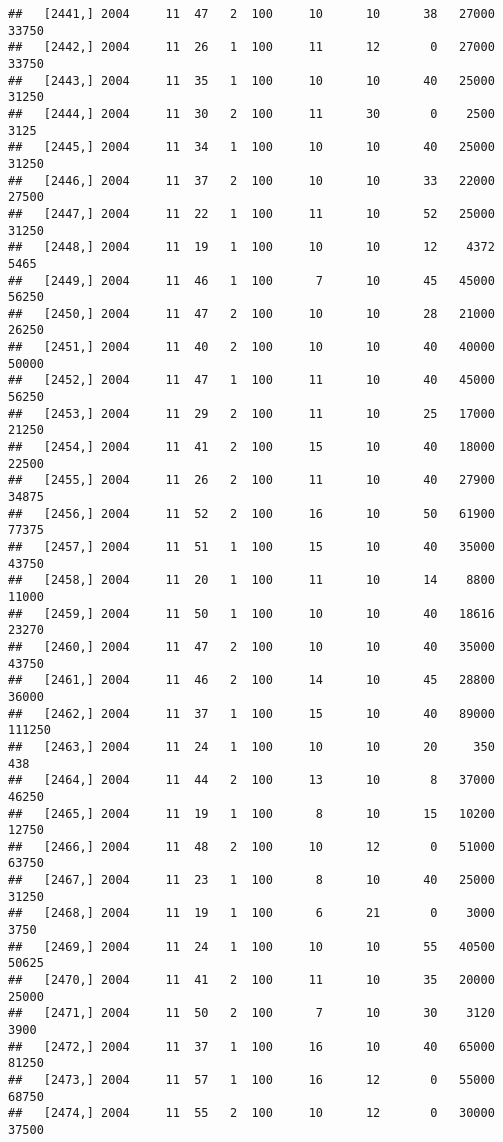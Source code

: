 \documentclass{article}\usepackage[]{graphicx}\usepackage[]{color}
\makeatletter
\newenvironment{kframe}{%
 \def\at@end@of@kframe{}%
 \ifinner\ifhmode%
  \def\at@end@of@kframe{\end{minipage}}%
  \begin{minipage}{\columnwidth}%
 \fi\fi%
 \def\FrameCommand##1{\hskip\@totalleftmargin \hskip-\fboxsep
 \colorbox{shadecolor}{##1}\hskip-\fboxsep
     \hskip-\linewidth \hskip-\@totalleftmargin \hskip\columnwidth}%
 \MakeFramed {\advance\hsize-\width
   \@totalleftmargin\z@ \linewidth\hsize
   \@setminipage}}%
 {\par\unskip\endMakeFramed%
 \at@end@of@kframe}
\newenvironment{knitrout}{}{} %
\makeatother
\begin{document}
\begin{knitrout}
\begin{kframe}
\begin{verbatim}
##   [2441,] 2004     11  47   2  100     10      10      38   27000   33750
##   [2442,] 2004     11  26   1  100     11      12       0   27000   33750
##   [2443,] 2004     11  35   1  100     10      10      40   25000   31250
##   [2444,] 2004     11  30   2  100     11      30       0    2500    3125
##   [2445,] 2004     11  34   1  100     10      10      40   25000   31250
##   [2446,] 2004     11  37   2  100     10      10      33   22000   27500
##   [2447,] 2004     11  22   1  100     11      10      52   25000   31250
##   [2448,] 2004     11  19   1  100     10      10      12    4372    5465
##   [2449,] 2004     11  46   1  100      7      10      45   45000   56250
##   [2450,] 2004     11  47   2  100     10      10      28   21000   26250
##   [2451,] 2004     11  40   2  100     10      10      40   40000   50000
##   [2452,] 2004     11  47   1  100     11      10      40   45000   56250
##   [2453,] 2004     11  29   2  100     11      10      25   17000   21250
##   [2454,] 2004     11  41   2  100     15      10      40   18000   22500
##   [2455,] 2004     11  26   2  100     11      10      40   27900   34875
##   [2456,] 2004     11  52   2  100     16      10      50   61900   77375
##   [2457,] 2004     11  51   1  100     15      10      40   35000   43750
##   [2458,] 2004     11  20   1  100     11      10      14    8800   11000
##   [2459,] 2004     11  50   1  100     10      10      40   18616   23270
##   [2460,] 2004     11  47   2  100     10      10      40   35000   43750
##   [2461,] 2004     11  46   2  100     14      10      45   28800   36000
##   [2462,] 2004     11  37   1  100     15      10      40   89000  111250
##   [2463,] 2004     11  24   1  100     10      10      20     350     438
##   [2464,] 2004     11  44   2  100     13      10       8   37000   46250
##   [2465,] 2004     11  19   1  100      8      10      15   10200   12750
##   [2466,] 2004     11  48   2  100     10      12       0   51000   63750
##   [2467,] 2004     11  23   1  100      8      10      40   25000   31250
##   [2468,] 2004     11  19   1  100      6      21       0    3000    3750
##   [2469,] 2004     11  24   1  100     10      10      55   40500   50625
##   [2470,] 2004     11  41   2  100     11      10      35   20000   25000
##   [2471,] 2004     11  50   2  100      7      10      30    3120    3900
##   [2472,] 2004     11  37   1  100     16      10      40   65000   81250
##   [2473,] 2004     11  57   1  100     16      12       0   55000   68750
##   [2474,] 2004     11  55   2  100     10      12       0   30000   37500

\end{verbatim}
\end{kframe}
\end{knitrout}
\end{document}

